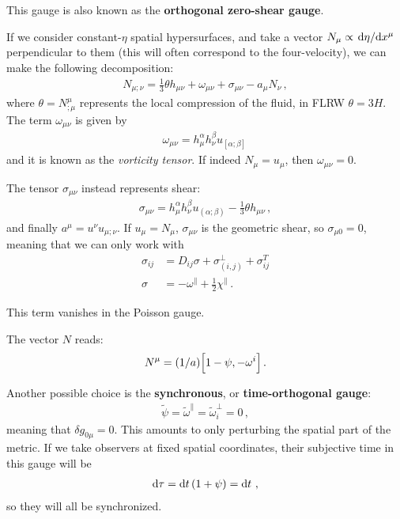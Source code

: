 \documentclass[main.tex]{subfiles}
\begin{document}
This gauge is also known as the \textbf{orthogonal zero-shear gauge}.

If we consider constant-\(\eta \) spatial hypersurfaces, and take a vector \(N_\mu \propto \dv*{\eta }{x^{\mu }}\) perpendicular to them (this will often correspond to the four-velocity), we can make the following decomposition: 
%
\begin{align}
N_{\mu ; \nu } = \frac{1}{3} \theta h_{\mu \nu } + \omega_{\mu \nu } + \sigma_{\mu \nu } - a_\mu N_\nu 
\,,
\end{align}
%
where \(\theta = N^{\mu }_{;\mu }\) represents the local compression of the fluid, in FLRW \(\theta = 3 H\).
The term \(\omega_{\mu \nu }\) is given by 
%
\begin{align}
\omega_{\mu \nu } =  h^{\alpha }_{\mu } h^{\beta }_{\nu } u_{[\alpha ; \beta ]}
\,
\end{align}
%
and it is known as the \emph{vorticity tensor}. 
If indeed \(N_\mu = u_\mu \), then \(\omega_{\mu \nu } = 0\). 

The tensor \(\sigma_{\mu \nu }\) instead represents shear:
%
\begin{align}
\sigma_{\mu \nu } =   h^{\alpha }_{\mu } h^{\beta }_{\nu } u_{(\alpha ; \beta )} - \frac{1}{3} \theta h_{\mu \nu }
\,,
\end{align}
%
and finally \(a^{\mu } = u^{\nu } u_{\mu ; \nu }\).
If \(u_{\mu} = N_\mu\), \(\sigma_{\mu \nu } \) is the geometric shear, so \(\sigma_{\mu 0} = 0\), meaning that we can only work with 
%
\begin{align} \label{eq:zero-shear-gauge}
\sigma_{ij} &= D_{ij} \sigma + \sigma^{\perp}_{(i, j)} + \sigma^{T}_{ij}  \\
\sigma &= - \omega^{\parallel} + \frac{1}{2} \chi^{\parallel}
\,.
\end{align}

This term vanishes in the Poisson gauge.

The vector \(N\) reads:
%
\begin{align}
 N^{\mu } =(1/a) \qty[1 - \psi,  - \omega^{i}]
\,.
\end{align}
%

Another possible choice is the \textbf{synchronous}, or \textbf{time-orthogonal gauge}: 
%
\begin{align}
\widetilde{\psi} = \widetilde{\omega}^{\parallel} = \widetilde{\omega}^{\perp}_i = 0
\,,
\end{align}
%
meaning that \(\delta g_{0\mu } = 0 \). 
This amounts to only perturbing the spatial part of the metric.
If we take observers at fixed spatial coordinates, their subjective time in this gauge will be 
%
\begin{align}
\dd{\tau } = \dd{t} \qty(1 + \psi ) = \dd{t}
\,,
\end{align}
%
so they will all be synchronized. 
\end{document}
